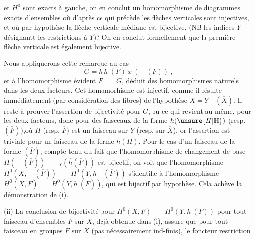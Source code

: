 
et $H^0$ sont exacts à gauche, on en conclut un homomorphisme de diagrammes exacts d'ensembles
où d'après ce qui précède les flèches verticales sont injectives, et où par hypothèse la flèche verticale médiane est bijective. (NB les indices $Y$ désignantt les restrictions à $Y$)? On en conclut formellement que la première flèche verticale est également bijective.

Nous appliquerons cette remarque au cas 
\[
G=h\ h\ (F)\ x\ (\quad(F))\ ,
\]
et à l'homomorphisme évident $F\qquad G$, déduit des homomorphismes naturels dans les deux facteurs. Cet homomorhisme est injectif, comme il résulte immédiatement (par considération des fibres) de l'hypothèse $X=Y\quad(\overline{X})$. Il reste à prouver l'assertion de bijectivité pour $G$, ou ce qui revient au même, pour les deux facteurs, donc pour des faisceaux de la forme $h(\unsure{H|\mathbb{H}})$ (resp. $(\overline{F})$),où $H$ (resp. $\overline{F}$) est un faisceau sur $Y$ (resp. sur $\overline{X}$). or l'assertion est triviale pour un faisceau de la forme $h(H)$. Pour le cas d'un faisceau de la forme $(\overline{F})$, compte tenu du fait que l'homomorphisme de changement de base $H(\quad(\overline{F}))\qquad{}_{Y}(\overline{h}(\overline{F}))$ est bijectif, on voit que l'homomorphisme $H^0(X,\quad(\overline{F}))\qquad H^0(Y,h\quad(\overline{F}))$ s'identifie à l'homomorphisme $H^0(\overline{X},\overline{F})\qquad H^0(\overline{Y},\overline{h}\ (\overline{F}))$, qui est bijectif par hypothèse. Cela achève la démonstration de (i).

(ii) La conclusion de bijectivité pour $H^0(X,F)\qquad H^0(Y,h\ (F))$ \margin{\handwritten{$\unsure{\backslash|\checkmark}$}}pour tout faisceau d'ensembles $F$ sur $X$, déjà obtenue dans (i), assure  que pour tout faisceau en groupes $F$ sur $X$ (pas nécessairement ind-finis), le foncteur restriction

